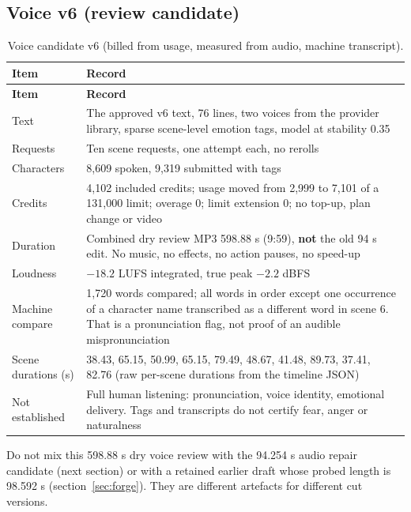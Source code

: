 \documentclass[11pt,a4paper]{article}
\newcommand{\code}[1]{\texttt{\detokenize{#1}}}
\begin{document}
\subsection{Voice v6 (review candidate)}
\begin{longtable}{@{}P{4.4cm}P{11.1cm}@{}}
\caption{Voice candidate v6 (billed from usage, measured from audio, machine transcript).}\\
\toprule \textbf{Item} & \textbf{Record}\\ \midrule\endfirsthead
\toprule \textbf{Item} & \textbf{Record}\\ \midrule\endhead
Text & The approved v6 text, 76 lines, two voices from the provider library, sparse scene-level emotion tags, \code{eleven_v3} model at stability 0.35\\
Requests & Ten scene requests, one attempt each, no rerolls\\
Characters & 8,609 spoken, 9,319 submitted with tags\\
Credits & 4,102 included credits; usage moved from 2,999 to 7,101 of a 131,000 limit; overage 0; limit extension 0; no top-up, plan change or video\\
Duration & Combined dry review MP3 598.88 s (9:59), \textbf{not} the old 94 s edit. No music, no effects, no action pauses, no speed-up\\
Loudness & $-18.2$ LUFS integrated, true peak $-2.2$ dBFS\\
Machine compare & 1,720 words compared; all words in order except one occurrence of a character name transcribed as a different word in scene 6. That is a pronunciation flag, not proof of an audible mispronunciation\\
Scene durations (s) & 38.43, 65.15, 50.99, 65.15, 79.49, 48.67, 41.48, 89.73, 37.41, 82.76 (raw per-scene durations from the timeline JSON)\\
Not established & Full human listening: pronunciation, voice identity, emotional delivery. Tags and transcripts do not certify fear, anger or naturalness\\
\bottomrule
\end{longtable}
Do not mix this 598.88 s dry voice review with the 94.254 s audio repair candidate (next section) or with a retained earlier draft whose probed length is 98.592 s (section~\ref{sec:forge}). They are different artefacts for different cut versions.
\end{document}
